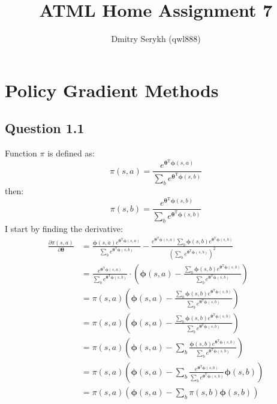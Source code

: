 \documentclass[a4paper]{article}
\title{\vspace{-5cm}ATML Home Assignment 7}
\author{Dmitry Serykh (qwl888)}
\newcommand*{\bs}[1]{\boldsymbol{#1}}
\begin{document}
\maketitle
\section{Policy Gradient Methods}
\label{sec:1}
\subsection*{Question 1.1}
\label{subsec:11}
Function $\pi$ is defined as:
\[
\pi(s, a)=\frac{e^{\boldsymbol{\theta}^{\mathrm{T}} \boldsymbol{\phi}(s, a)}}
   {\sum_{b} e^{\boldsymbol{\theta}^{\mathrm{T}} \boldsymbol{\phi}(s, b)}}
\]
then:
\[
\pi(s, b)=\frac{e^{\boldsymbol{\theta}^{\mathrm{T}} \boldsymbol{\phi}(s, b)}}
   {\sum_{b} e^{\boldsymbol{\theta}^{\mathrm{T}} \boldsymbol{\phi}(s, b)}}
\]
I start by finding the derivative:
\begin{align*}
  \frac{\partial \pi(s, a)}{\partial \bs{\theta}} &=
  \frac{\bs{\phi}(s,a) e^{\boldsymbol{\theta}^{\mathrm{T}} \boldsymbol{\phi}(s, a)}}
       {\sum_{b} e^{\boldsymbol{\theta}^{\mathrm{T}} \boldsymbol{\phi}(s, b)}}
  -
  \frac{e^{\boldsymbol{\theta}^{\mathrm{T}} \boldsymbol{\phi}(s, a)}
        \sum_{b} \boldsymbol{\phi}(s, b)e^{\boldsymbol{\theta}^{\mathrm{T}} \boldsymbol{\phi}(s, b)}}
       {(\sum_{b} e^{\boldsymbol{\theta}^{\mathrm{T}} \boldsymbol{\phi}(s, b)})^2}\\
       &=\frac{e^{\boldsymbol{\theta}^{\mathrm{T}} \boldsymbol{\phi}(s, a)}}
              {\sum_{b} e^{\boldsymbol{\theta}^{\mathrm{T}} \boldsymbol{\phi}(s, b)}}
         \cdot
         \left(
         \boldsymbol{\phi}(s, a)-
         \frac{\sum_{b} \boldsymbol{\phi}(s, b)e^{\boldsymbol{\theta}^{\mathrm{T}} \boldsymbol{\phi}(s, b)}}
              {\sum_{b} e^{\boldsymbol{\theta}^{\mathrm{T}} \boldsymbol{\phi}(s, b)}}
              \right)\\
  &=
   \pi(s, a)\left(
   \boldsymbol{\phi}(s, a)-
   \frac{\sum_{b} \boldsymbol{\phi}(s, b)e^{\boldsymbol{\theta}^{\mathrm{T}} \boldsymbol{\phi}(s, b)}}
        {\sum_{b} e^{\boldsymbol{\theta}^{\mathrm{T}} \boldsymbol{\phi}(s, b)}}
   \right)\\
  &=
   \pi(s, a)\left(
  \boldsymbol{\phi}(s, a)-
  \frac{\sum_{b} \boldsymbol{\phi}(s, b)e^{\boldsymbol{\theta}^{\mathrm{T}} \boldsymbol{\phi}(s, b)}}
       {\sum_{b} e^{\boldsymbol{\theta}^{\mathrm{T}} \boldsymbol{\phi}(s, b)}}
       \right)\\
  &=
   \pi(s, a)\left(
  \boldsymbol{\phi}(s, a)-
  \sum_{b} \frac{\boldsymbol{\phi}(s, b)e^{\boldsymbol{\theta}^{\mathrm{T}} \boldsymbol{\phi}(s, b)}}
       {\sum_{b} e^{\boldsymbol{\theta}^{\mathrm{T}} \boldsymbol{\phi}(s, b)}}
       \right)\\
  &=
  \pi(s, a)\left(
  \boldsymbol{\phi}(s, a)-
  \sum_{b} \frac{e^{\boldsymbol{\theta}^{\mathrm{T}} \boldsymbol{\phi}(s, b)}}
      {\sum_{b} e^{\boldsymbol{\theta}^{\mathrm{T}} \boldsymbol{\phi}(s, b)}
      }\boldsymbol{\phi}(s, b)
  \right)\\
  &=
  \pi(s, a)\left(
  \boldsymbol{\phi}(s, a)-
  \sum_{b}
  \pi(s, b)
  \boldsymbol{\phi}(s, b)
  \right)
\end{align*}
\end{document}
